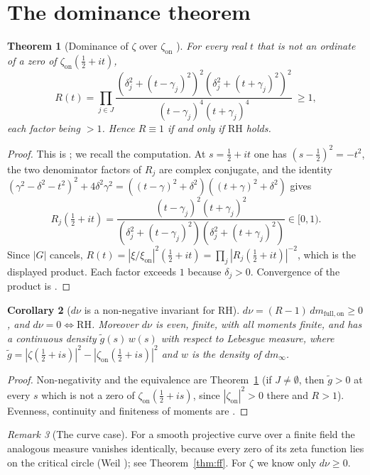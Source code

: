 \documentclass[11pt]{amsart}
\newtheorem{theorem}{Theorem}[section]
\newtheorem{corollary}[theorem]{Corollary}
\theoremstyle{definition}
\theoremstyle{remark}
\newtheorem{remark}[theorem]{Remark}
\newcommand{\RH}{\mathrm{RH}}
\newcommand{\half}{\tfrac12}
\newcommand{\dnu}{d\nu}
\newcommand{\dmon}{dm_{\mathrm{full,on}}}
\newcommand{\zon}{\zeta_{\mathrm{on}}}
\newcommand{\xon}{\xi_{\mathrm{on}}}
\begin{document}
\section{The dominance theorem}\label{sec:dominance}

\begin{theorem}[Dominance of $\zeta$ over $\zon$ \cite{MomentRigidity}]\label{thm:dominance}
For every real $t$ that is not an ordinate of a zero of $\zon(\half+it)$,
\[
R(t)=\prod_{j\in J}\frac{(\delta_j^2+(t-\gamma_j)^2)^2(\delta_j^2+(t+\gamma_j)^2)^2}
{(t-\gamma_j)^4(t+\gamma_j)^4}\ \ge 1,
\]
each factor being $>1$. Hence $R\equiv1$ if and only if $\RH$ holds.
\end{theorem}
\begin{proof}
This is \cite[Prop.~3.4]{MomentRigidity}; we recall the computation. At $s=\half+it$ one has
$(s-\half)^2=-t^2$, the two denominator factors of $R_j$ are complex conjugate, and the identity
$(\gamma^2-\delta^2-t^2)^2+4\delta^2\gamma^2=((t-\gamma)^2+\delta^2)((t+\gamma)^2+\delta^2)$ gives
\[
R_j(\half+it)=\frac{(t-\gamma_j)^2(t+\gamma_j)^2}{(\delta_j^2+(t-\gamma_j)^2)(\delta_j^2+(t+\gamma_j)^2)}
\in[0,1).
\]
Since $|G|$ cancels, $R(t)=|\xi/\xon|^2(\half+it)=\prod_j|R_j(\half+it)|^{-2}$, which is the
displayed product. Each factor exceeds $1$ because $\delta_j>0$. Convergence of the product is
\cite[Lemma~3.2]{MomentRigidity}.
\end{proof}

\begin{corollary}[$\dnu$ is a non-negative invariant for $\RH$]\label{cor:dnu}
$\dnu=(R-1)\,\dmon\ge0$, and $\dnu=0\iff\RH$. Moreover $\dnu$ is even, finite, with all moments
finite, and has a continuous density $\tilde g(s)\,w(s)$ with respect to Lebesgue measure, where
$\tilde g=|\zeta(\half+is)|^2-|\zon(\half+is)|^2$ and $w$ is the density of $dm_\infty$.
\end{corollary}
\begin{proof}
Non-negativity and the equivalence are Theorem~\ref{thm:dominance} (if $J\ne\emptyset$, then
$\tilde g>0$ at every $s$ which is not a zero of $\zon(\half+is)$, since $|\zon|^2>0$ there and
$R>1$). Evenness, continuity and finiteness of moments are \cite[Lemma~3.2,
Prop.~3.6]{MomentRigidity}.
\end{proof}

\begin{remark}[The curve case]\label{rem:curve}
For a smooth projective curve over a finite field the analogous measure vanishes identically,
because every zero of its zeta function lies on the critical circle (Weil \cite{Weil48}); see
Theorem~\ref{thm:ff}. For $\zeta$ we know only $\dnu\ge0$.
\end{remark}
\end{document}
